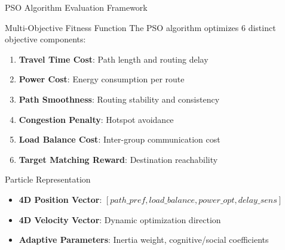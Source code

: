 \documentclass[10pt,aspectratio=169]{beamer}
\begin{document}
\begin{frame}{PSO Algorithm Evaluation Framework}
    \begin{block}{Multi-Objective Fitness Function}
        The PSO algorithm optimizes 6 distinct objective components:
        \begin{enumerate}
            \item \textbf{Travel Time Cost}: Path length and routing delay
            \item \textbf{Power Cost}: Energy consumption per route
            \item \textbf{Path Smoothness}: Routing stability and consistency
            \item \textbf{Congestion Penalty}: Hotspot avoidance
            \item \textbf{Load Balance Cost}: Inter-group communication cost
            \item \textbf{Target Matching Reward}: Destination reachability
        \end{enumerate}
    \end{block}
    
    \begin{block}{Particle Representation}
        \begin{itemize}
            \item \textbf{4D Position Vector}: $[path\_pref, load\_balance, power\_opt, delay\_sens]$
            \item \textbf{4D Velocity Vector}: Dynamic optimization direction
            \item \textbf{Adaptive Parameters}: Inertia weight, cognitive/social coefficients
        \end{itemize}
    \end{block}
\end{frame}
\end{document}
